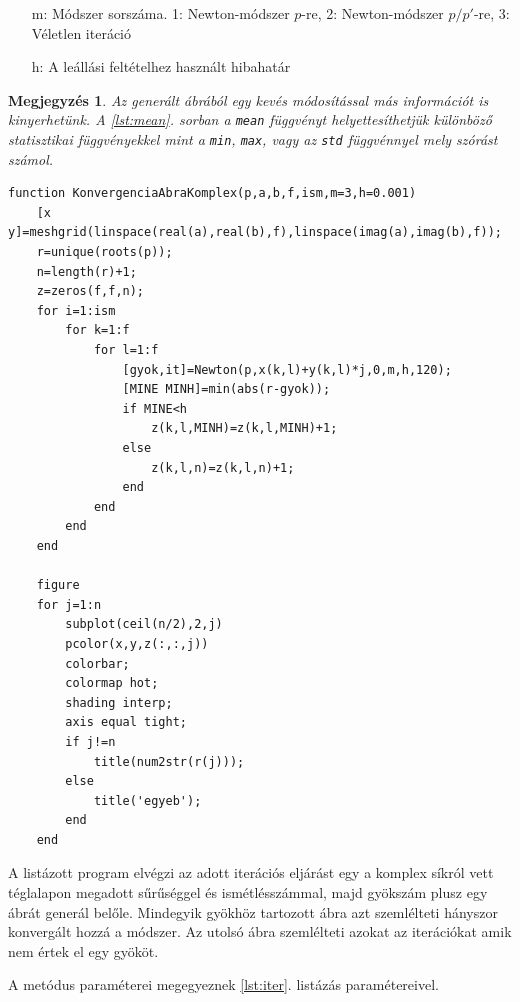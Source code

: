 \documentclass[a4paper,12pt]{report}
\newtheorem{Megj}[Tet]{Megjegyzés}
\begin{document}
\begin{appendices}
\begin{enumerate}
				\item[m:] Módszer sorszáma. 1: Newton-módszer $p$-re, 2: Newton-módszer $p/p'$-re, 3: Véletlen iteráció
				\item[h:] A leállási feltételhez használt hibahatár
			\end{enumerate}
			\begin{Megj}\label{app:megj}
				Az generált ábrából egy kevés módosítással más információt is kinyerhetünk. A \ref{lst:mean}. sorban a \texttt{mean} függvényt helyettesíthetjük különböző statisztikai függvényekkel mint a \texttt{min}, \texttt{max}, vagy az \texttt{std} függvénnyel mely szórást számol.
			\end{Megj}
			\begin{singlespace}
            \begin{lstlisting}[caption=KonvergenciaAbraKomplex.m]
function KonvergenciaAbraKomplex(p,a,b,f,ism,m=3,h=0.001)
    [x y]=meshgrid(linspace(real(a),real(b),f),linspace(imag(a),imag(b),f));
    r=unique(roots(p));
    n=length(r)+1;
    z=zeros(f,f,n);
    for i=1:ism
        for k=1:f
            for l=1:f
                [gyok,it]=Newton(p,x(k,l)+y(k,l)*j,0,m,h,120);
                [MINE MINH]=min(abs(r-gyok));
                if MINE<h
                    z(k,l,MINH)=z(k,l,MINH)+1;
                else
                    z(k,l,n)=z(k,l,n)+1;
                end
            end
        end
    end

    figure
    for j=1:n
        subplot(ceil(n/2),2,j)
        pcolor(x,y,z(:,:,j))
        colorbar;
        colormap hot;
        shading interp;
        axis equal tight;
        if j!=n
            title(num2str(r(j)));
        else
            title('egyeb');
        end
    end
			\end{lstlisting}
            \end{singlespace}
			A listázott program elvégzi az adott iterációs eljárást egy a komplex síkról vett téglalapon megadott sűrűséggel és ismétlésszámmal, majd gyökszám plusz egy ábrát generál belőle. Mindegyik gyökhöz tartozott ábra azt szemlélteti hányszor konvergált hozzá a módszer. Az utolsó ábra szemlélteti azokat az iterációkat amik nem értek el egy gyököt.

			A metódus paraméterei megegyeznek \ref{lst:iter}. listázás paramétereivel.
\end{appendices}
\end{document}
